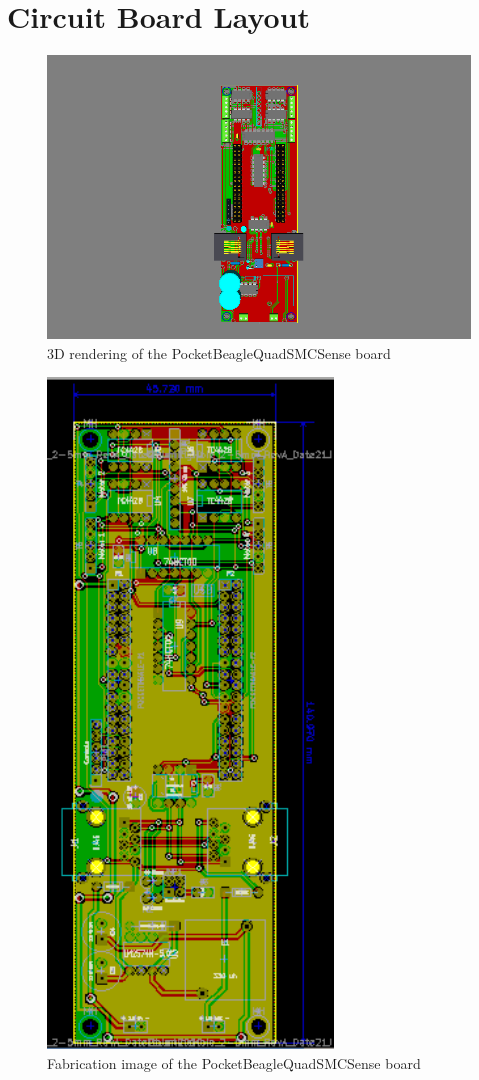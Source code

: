 \section{Circuit Board Layout}

\begin{figure}[hbpt]\begin{centering}%
\includegraphics[width=5in]{PocketBeagleQuadSMCSense3DTop.png}
\caption{3D rendering of the PocketBeagleQuadSMCSense board}
\end{centering}\end{figure}
\begin{figure}[hbpt]\begin{centering}%
\includegraphics[height=7in]{PocketBeagleQuadSMCSense.png}
\caption{Fabrication image of the PocketBeagleQuadSMCSense board}
\end{centering}\end{figure}
